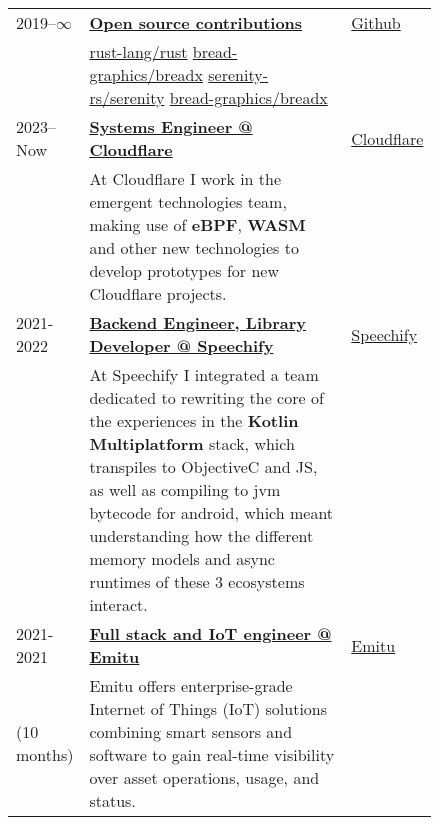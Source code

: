 \documentclass{article}
\newcommand{\ul}[1]{\underline{#1}}
\begin{document}
\begin{tabular}{p{0.11\linewidth}p{0.73\linewidth}l}

    2019--$\infty$ & \ul{\textbf{Open source contributions}} & \href{https://github.com}{Github} \\
    &
        \href{https://github.com/rust-lang/rust/pulls?q=author\%3Amendess+}
            {rust-lang/rust}
        \hspace{2em}
        \href{https://github.com/libbpf/libbpf-rs/pulls?q=author\%3Amendess+}
            {bread-graphics/breadx}
        \hspace{2em}
        \href{https://github.com/serenity-rs/serenity/pulls?q=author\%3Amendess+}
            {serenity-rs/serenity}
        \hspace{2em}
        \href{https://github.com/bread-graphics/breadx/pulls?q=author\%3Amendess+}
            {bread-graphics/breadx}
    & \\

    2023--Now & \ul{\textbf{Systems Engineer @ Cloudflare}} & \href{https://cloudflare.com}{Cloudflare} \\
    &
        At Cloudflare I work in the emergent technologies team, making use
        of \textbf{eBPF}, \textbf{WASM} and other new technologies to develop prototypes for new
        Cloudflare projects.
    & \\

    2021-2022 & \ul{\textbf{Backend Engineer, Library Developer @ Speechify}} & \href{https://speechify.com}{Speechify} \\
    &
        At Speechify I integrated a team dedicated to rewriting the core
        of the experiences in the \textbf{Kotlin Multiplatform} stack, which transpiles to
        ObjectiveC and JS, as well as compiling to jvm bytecode for android,
        which meant understanding how the different memory models and async
        runtimes of these 3 ecosystems interact.
    & \\

    2021-2021 & \ul{\textbf{Full stack and IoT engineer @ Emitu}} & \href{https://emitu.com}{Emitu} \\
    (10 months)
    &
        Emitu offers enterprise-grade Internet of Things (IoT) solutions combining
        smart sensors and software to gain real-time visibility over asset
        operations, usage, and status.
    & \\

\end{tabular}
\end{document}
